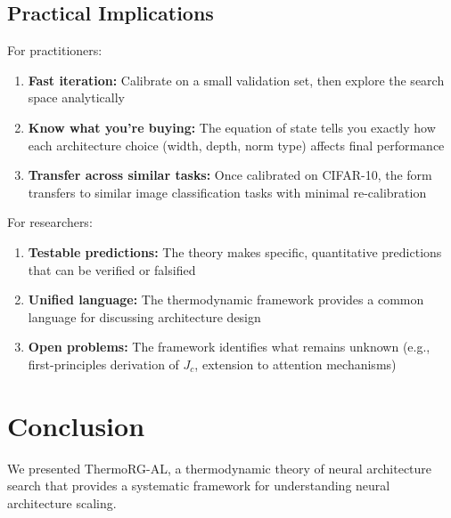 \documentclass[11pt, a4paper]{article}
\theoremstyle{plain}
\begin{document}
\subsection{Practical Implications}

For practitioners:
\begin{enumerate}
\item \textbf{Fast iteration:} Calibrate on a small validation set, then explore the search space analytically
\item \textbf{Know what you're buying:} The equation of state tells you exactly how each architecture choice (width, depth, norm type) affects final performance
\item \textbf{Transfer across similar tasks:} Once calibrated on CIFAR-10, the form transfers to similar image classification tasks with minimal re-calibration
\end{enumerate}

For researchers:
\begin{enumerate}
\item \textbf{Testable predictions:} The theory makes specific, quantitative predictions that can be verified or falsified
\item \textbf{Unified language:} The thermodynamic framework provides a common language for discussing architecture design
\item \textbf{Open problems:} The framework identifies what remains unknown (e.g., first-principles derivation of $J_c$, extension to attention mechanisms)
\end{enumerate}

\section{Conclusion}

We presented ThermoRG-AL, a thermodynamic theory of neural architecture search that provides a systematic framework for understanding neural architecture scaling.
\end{document}
